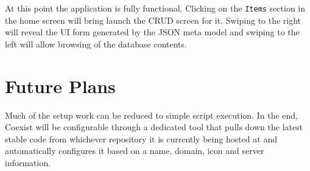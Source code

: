 \documentclass[journal]{IEEEtran}
\begin{document}
At this point the application is fully functional. Clicking on the \texttt{Items} section in the home screen will bring launch the CRUD screen for it. Swiping to the right will reveal the UI form generated by the JSON meta model and swiping to the left will allow browsing of the database contents. 

\section{Future Plans} \label{sec:}

Much of the setup work can be reduced to simple script execution. In the end, Coexist will be configurable through a dedicated tool that pulls down the latest stable code from whichever repository it is currently being hosted at and automatically configures it based on a name, domain, icon and server information.











\end{document}
